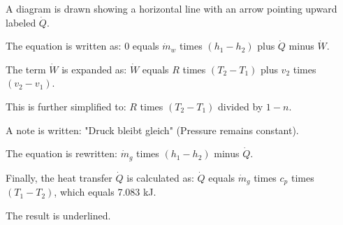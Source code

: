 A diagram is drawn showing a horizontal line with an arrow pointing upward labeled \( \dot{Q} \).  

The equation is written as:  
0 equals \( \dot{m}_w \) times \( (h_1 - h_2) \) plus \( \dot{Q} \) minus \( \dot{W} \).  

The term \( \dot{W} \) is expanded as:  
\( \dot{W} \) equals \( R \) times \( (T_2 - T_1) \) plus \( v_2 \) times \( (v_2 - v_1) \).  

This is further simplified to:  
\( R \) times \( (T_2 - T_1) \) divided by \( 1 - n \).  

A note is written: "Druck bleibt gleich" (Pressure remains constant).  

The equation is rewritten:  
\( \dot{m}_g \) times \( (h_1 - h_2) \) minus \( \dot{Q} \).  

Finally, the heat transfer \( \dot{Q} \) is calculated as:  
\( \dot{Q} \) equals \( \dot{m}_g \) times \( c_p \) times \( (T_1 - T_2) \), which equals 7.083 kJ.  

The result is underlined.